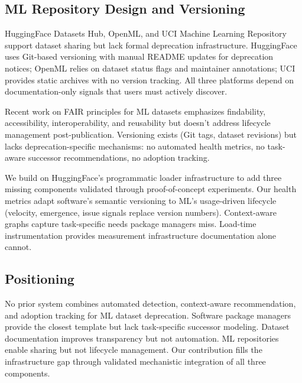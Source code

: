 \subsection{ML Repository Design and Versioning}

HuggingFace Datasets Hub, OpenML, and UCI Machine Learning Repository support dataset sharing but lack formal deprecation infrastructure. HuggingFace uses Git-based versioning with manual README updates for deprecation notices; OpenML relies on dataset status flags and maintainer annotations; UCI provides static archives with no version tracking. All three platforms depend on documentation-only signals that users must actively discover.

Recent work on FAIR principles for ML datasets \cite{wilkinson2016fair} emphasizes findability, accessibility, interoperability, and reusability but doesn't address lifecycle management post-publication. Versioning exists (Git tags, dataset revisions) but lacks deprecation-specific mechanisms: no automated health metrics, no task-aware successor recommendations, no adoption tracking.

We build on HuggingFace's programmatic loader infrastructure to add three missing components validated through proof-of-concept experiments. Our health metrics adapt software's semantic versioning to ML's usage-driven lifecycle (velocity, emergence, issue signals replace version numbers). Context-aware graphs capture task-specific needs package managers miss. Load-time instrumentation provides measurement infrastructure documentation alone cannot.

\subsection{Positioning}

No prior system combines automated detection, context-aware recommendation, and adoption tracking for ML dataset deprecation. Software package managers provide the closest template but lack task-specific successor modeling. Dataset documentation improves transparency but not automation. ML repositories enable sharing but not lifecycle management. Our contribution fills the infrastructure gap through validated mechanistic integration of all three components.

